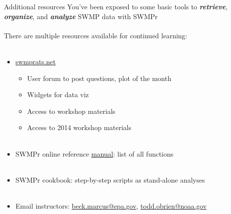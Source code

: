 \documentclass[xcolor=dvipsnames]{beamer}\usepackage[]{graphicx}\usepackage[]{color}
\newcommand{\Bigtxt}[1]{\textbf{\textit{#1}}}
\begin{document}
\begin{frame}{Additional resources}
You've been exposed to some basic tools to \Bigtxt{retrieve}, \Bigtxt{organize}, and \Bigtxt{analyze} SWMP data with SWMPr \\~\\
There are multiple resources available for continued learning: \\~\\
\begin{itemize}
\item \href{http://swmprats.net/}{swmprats.net}
\begin{itemize}
\item User forum to post questions, plot of the month
\item Widgets for data viz
\item Access to workshop materials
\item Access to 2014 workshop materials \\~\\
\end{itemize}
\item SWMPr online reference \href{https://cran.r-project.org/web/packages/SWMPr/SWMPr.pdf}{manual}: list of all functions \\~\\
\item SWMPr cookbook: step-by-step scripts as stand-alone analyses \\~\\
\item Email instructors: \href{mailto:beck.marcus@epa.gov}{beck.marcus@epa.gov}, \href{todd.obrien@noaa.gov}{todd.obrien@noaa.gov}
\end{itemize}
\end{frame}

\end{document}
